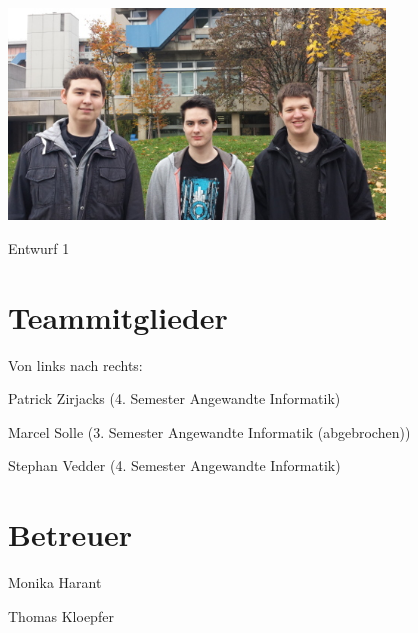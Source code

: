  
\begin{DoxyImage}
\includegraphics[width=10cm]{team.jpg}
\caption{Entwurf 1}
\end{DoxyImage}
 \hypertarget{Das_Teammitglieder}{}\section{Teammitglieder}\label{Das_Teammitglieder}
Von links nach rechts\-:\par
Patrick Zirjacks (4. Semester Angewandte Informatik)\par
Marcel Solle (3. Semester Angewandte Informatik (abgebrochen))\par
Stephan Vedder (4. Semester Angewandte Informatik)\par
 \hypertarget{Das_Betreuer}{}\section{Betreuer}\label{Das_Betreuer}
Monika Harant\par
Thomas Kloepfer 